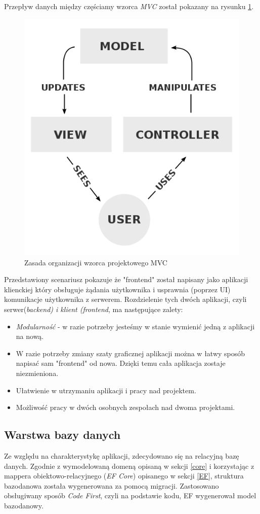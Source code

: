 \documentclass[12pt]{article}
\numberwithin{figure}{section}
\begin{document}
\begin{sloppypar}
Przepływ danych między częściamy wzorca \textit{MVC} został pokazany na rysunku \ref{fig:mvc-flow}.
    
\begin{figure}[H] 
    \centering
    \includegraphics[width=.5\textwidth]{images/chapter_3/mvc-flow.png}
    \caption{Zasada organizacji wzorca projektowego MVC \cite{mvc-flow}}
    \label{fig:mvc-flow}
\end{figure}
    
Przedstawiony scenariusz pokazuje że "frontend" został napisany jako aplikacji klienckiej który obsługuje żądania użytkownika i usprawnia (poprzez UI) komunikacje użytkownika z serwerem. 
Rozdzielenie tych dwóch aplikacji, czyli serwer(\textit{backend) i klient (\textit{frontend}}, ma następujące zalety:
\begin{itemize}
    \item \textit{Modularność} - w razie potrzeby jesteśmy w stanie wymienić jedną z aplikacji na nową.
    \item W razie potrzeby zmiany szaty graficznej aplikacji można w łatwy sposób napisać sam "frontend" od nowa. Dzięki temu cała aplikacja zostaje niezmieniona.
    \item Ułatwienie w utrzymaniu aplikacji i pracy nad projektem.
    \item Możliwość pracy w dwóch osobnych zespołach nad dwoma projektami.
\end{itemize}
    

\subsection{Warstwa bazy danych}
Ze względu na charakterystykę aplikacji, zdecydowano się na relacyjną bazę danych.
Zgodnie z wymodelowaną domeną opisaną w sekcji \ref{core} i korzystając z mappera obiektowo-relacyjnego (\textit{EF Core}) opisanego w sekcji \ref{EF}, struktura bazodanowa została wygenerowana za pomocą migracji. Zastosowano obsługiwany sposób \textit{Code First}, czyli na podstawie kodu, EF wygenerował model bazodanowy.
    

\end{sloppypar}
\end{document}
